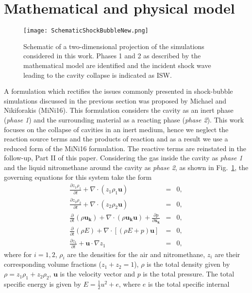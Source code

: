 \documentclass[3p,times,twocolumn]{elsarticle}
\begin{document}
\section{Mathematical and physical model}
\begin{figure}[!tb]
\centering
\texttt{[image: SchematicShockBubbleNew.png]}
\caption{Schematic of a two-dimensional projection of the simulations considered in this work. Phases 1 and 2 as described by the mathematical model are identified and the incident shock wave leading to the cavity collapse is indicated as ISW.}
\label{sketch}
 \end{figure}
A formulation which rectifies the issues commonly presented in shock-bubble simulations discussed in the previous section was proposed by Michael and Nikiforakis \cite{michael2016hybrid} (MiNi16). This formulation considers the cavity as an inert phase (\emph{phase 1}) and the surrounding material as a reacting phase (\emph{phase 2}). This work focuses on the collapse of cavities in an inert medium, hence we neglect the reaction source terms and the products of reaction and as a result we use a reduced form of the MiNi16 formulation. The reactive terms are reinstated in the follow-up, Part II of this paper. Considering the gas inside the cavity as \emph{phase 1} and the liquid nitromethane around the cavity as  \emph{phase 2}, as shown in Fig.\ \ref{sketch}, the governing equations for this system take the form
\begin{eqnarray}
\frac{\partial z_1 \rho_1}{\partial t}+\nabla \cdot(z_1 \rho_1 \mathbf{u})& = & 0, \nonumber \\
\frac{\partial z_2 \rho_2}{\partial t}+\nabla \cdot(z_2 \rho_2 \mathbf{u})& = & 0, \nonumber\\ \label{Hyb:system}
\frac{\partial}{\partial t}(\rho \mathbf{u_k})+\nabla \cdot(\rho \mathbf{u_ku})+\frac{\partial p}{\partial{\mathbf{x_k}}} & = & 0, \\ 
\frac{\partial}{\partial t}(\rho E)+\nabla \cdot [ (\rho E+p)\mathbf{u}] & = & 0, \nonumber \\ 
\frac{\partial z_1 }{\partial t} + \mathbf{u} \cdot \nabla z_1  & = & 0, \nonumber  
\end{eqnarray}
where for $i=1,2$, $\rho_i$  are the densities for the air and nitromethane, $z_i$ are their corresponding volume fractions 
($z_1+z_2=1$),
$\rho$ is the total density given by $\rho=z_1\rho_1+z_2\rho_2$, $\mathbf{u}$
is the velocity vector and $p$ is the total pressure. The total specific energy is given by $E=\frac{1}{2}u^2+e$, where $e$ is the total specific internal
\end{document}
